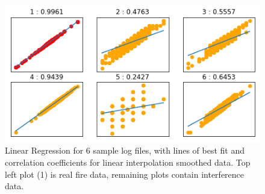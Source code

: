 \begin{figure}[tb]
 \centering %
 \includegraphics[width=\columnwidth]{pictures/03-li-linear-regression.png}
 \caption{Linear Regression for 6 sample log files, with lines of best fit and correlation coefficients for linear interpolation smoothed data. Top left plot (1) is real fire data, remaining plots contain interference data.}
 \label{fig:sample}
\end{figure}

